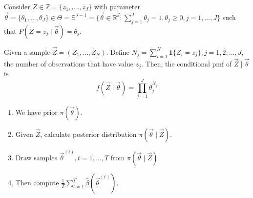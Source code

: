 \documentclass[11pt]{elegantbook}
\begin{document}
Consider $Z\in \mathbb{Z}=\{z_1,....,z_J\}$ with parameter $\vec{\theta}=\{\theta_1,...,\theta_J\}\in \Theta= \mathbb{S}^{J-1}=\{\vec{\theta}\in \mathbb{R}^J:\sum_{j=1}^J\theta_j=1,\theta_j\geq 0, j=1,...,J\}$ such that $P(Z=z_j\mid\vec{\theta})=\theta_j$.

Given a sample $\vec{Z}=\left(Z_1,...,Z_N\right)$. Define $N_j=\sum_{i=1}^N \mathbf{1}\{Z_i=z_j\}, j=1,2,...,J$, the number of observations that have value $z_j$. Then, the conditional pmf of $\vec{Z}\mid\vec{\theta}$ is $$f(\vec{Z}\mid\vec{\theta})=\prod_{j=1}^J\theta_j^{N_j}$$

\begin{definition}
\normalfont
\begin{enumerate}[(1).]
    \item We have prior $\pi(\vec{\theta})$.
    \item Given $\vec{Z}$, calculate posterior distribution $\pi(\vec{\theta}\mid \vec{Z})$.
    \item Draw samples $\vec{\theta}^{(t)},t=1,...,T$ from $\pi(\vec{\theta}\mid \vec{Z})$.
    \item Then compute $\frac{1}{T}\sum_{t=1}^T\hat{\beta}(\vec{\theta}^{(t)})$.
\end{enumerate}
\end{definition}
\end{document}
